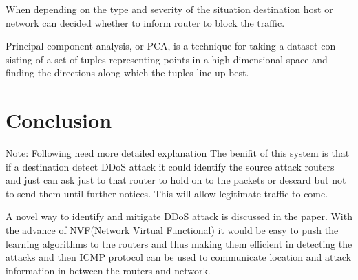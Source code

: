 \documentclass[10pt,oneside,a4paper]{article}
\begin{document}
When depending on the type and severity of the situation destination host or network can decided whether to inform router to block the traffic.


Principal-component analysis, or PCA, is a technique for taking a dataset con-
sisting of a set of tuples representing points in a high-dimensional space and
finding the directions along which the tuples line up best.

\section{Conclusion}

{Note: Following need more detailed explanation}
The benifit of this system is that if a destination detect DDoS attack it could identify the source attack routers and just can ask just to that router to hold on to the packets or descard but not to send them until further notices. This will allow legitimate traffic to come.

A novel way to identify and mitigate DDoS attack is discussed in the paper. With the advance of NVF(Network Virtual Functional) it would be easy to push the learning algorithms to the routers and thus making them efficient in detecting the attacks and then ICMP protocol can be used to communicate location and attack information in between the routers and network.

\end{document}
